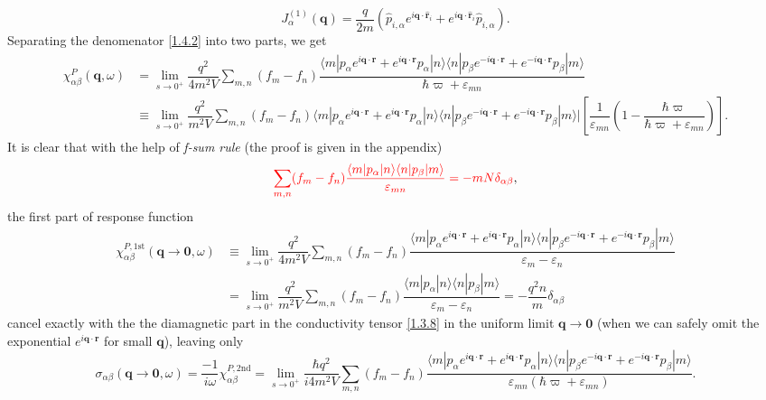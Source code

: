 \documentclass[10pt,nofootinbib,letterpaper]{revtex4}
\begin{document}
		\begin{equation}\label{1.4.4}
			J^{(1)}_\alpha(\bm{q})=\dfrac{q}{2m}(\hat p_{i,\alpha} e^{i\bm{q}\cdot\hat{\bm{r}}_i}+e^{i\bm{q}\cdot\hat{\bm{r}}_i}\hat{p}_{i,\alpha}).
		\end{equation}
		Separating the denomenator \eqref{1.4.2} into two parts, we get
		\begin{align}
			\chi_{\alpha\beta}^P(\bm{q},\omega)&=\lim_{s \rightarrow0^+}\dfrac{q^2}{4m^2V}\sum_{m,n}(f_m-f_n)\dfrac{\langle m|p_\alpha e^{i\bm{q}\cdot\bm{r}}+e^{i\bm{q}\cdot\bm{r}}p_\alpha|n\rangle\langle n|p_\beta e^{-i\bm{q}\cdot\bm{r}}+e^{-i\bm{q}\cdot\bm{r}}p_\beta|m\rangle}{\hbar\varpi+\varepsilon_{mn}}\\
			&\equiv\lim_{s \rightarrow0^+}\dfrac{q^2}{m^2V}\sum_{m,n}(f_m-f_n)\langle m|p_\alpha e^{i\bm{q}\cdot\bm{r}}+e^{i\bm{q}\cdot\bm{r}}p_\alpha|n\rangle\langle n|p_\beta e^{-i\bm{q}\cdot\bm{r}}+e^{-i\bm{q}\cdot\bm{r}}p_\beta|m\rangle|\left[\dfrac{1}{\varepsilon_{mn}}\left(1-\dfrac{\hbar\varpi}{\hbar\varpi+\varepsilon_{mn}}\right)\right].\label{1.4.5}
		\end{align}
		\indent It is clear that with the help of \emph{f-sum rule} (the proof is given in the appendix)
		\begin{equation}\label{1.4.6}
			{\color{red}\sum_{m,n}(f_m-f_n)\dfrac{\langle m|p_\alpha|n\rangle\langle n|p_\beta|m\rangle}{\varepsilon_{mn}}=-mN\delta_{\alpha\beta}},
		\end{equation}
		the first part of response function
		\begin{align}\label{1.4.7}
			\chi_{\alpha\beta}^{P,\text{1st}}(\bm{q}\rightarrow\bm{0},\omega)&\equiv\lim_{s \rightarrow0^+}\dfrac{q^2}{4m^2V}\sum_{m,n}(f_m-f_n)\dfrac{\langle m|p_\alpha e^{i\bm{q}\cdot\bm{r}}+e^{i\bm{q}\cdot\bm{r}}p_\alpha|n\rangle\langle n|p_\beta e^{-i\bm{q}\cdot\bm{r}}+e^{-i\bm{q}\cdot\bm{r}}p_\beta|m\rangle}{\varepsilon_m-\varepsilon_n}\nonumber\\
			&=\lim_{s \rightarrow0^+}\dfrac{q^2}{m^2V}\sum_{m,n}(f_m-f_n)\dfrac{\langle m|p_\alpha|n\rangle\langle n|p_\beta|m\rangle}{\varepsilon_m-\varepsilon_n}=-\dfrac{q^2 n}{m}\delta_{\alpha\beta}
		\end{align}
		cancel exactly with the the diamagnetic part in the conductivity tensor \eqref{1.3.8} in the uniform limit $\bm{q}\rightarrow\bm{0}$ (when we can safely omit the exponential $e^{i\bm{q}\cdot\bm{r}}$ for small $\bm{q}$), leaving only
		\begin{equation}\label{1.4.8}
			\sigma_{\alpha\beta}(\bm{q}\rightarrow\bm{0},\omega)=\dfrac{-1}{i\omega}\chi_{\alpha\beta}^{P,\text{2nd}}=\lim_{s \rightarrow0^+}\dfrac{\hbar q^2}{i4m^2V}\sum_{m,n}(f_m-f_n)\dfrac{\langle m|p_\alpha e^{i\bm{q}\cdot\bm{r}}+e^{i\bm{q}\cdot\bm{r}}p_\alpha|n\rangle\langle n|p_\beta e^{-i\bm{q}\cdot\bm{r}}+e^{-i\bm{q}\cdot\bm{r}}p_\beta|m\rangle}{\varepsilon_{mn}(\hbar\varpi+\varepsilon_{mn})}.
		\end{equation}
\end{document}
